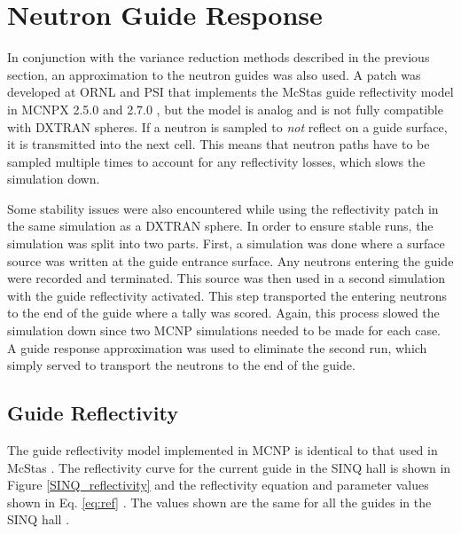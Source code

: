 \documentclass[a4paper]{jpconf}
\begin{document}
\section{Neutron Guide Response} 

In conjunction with the variance reduction methods described in the previous section, an approximation to the neutron guides was also used.  A patch was developed at ORNL and PSI that implements the McStas guide reflectivity model in MCNPX 2.5.0 and 2.7.0 \cite{mcnp_reflectivity, EK_reflectivity}, but the model is analog and is not fully compatible with DXTRAN spheres.  If a neutron is sampled to \emph{not} reflect on a guide surface, it is transmitted into the next cell.  This means that neutron paths have to be sampled multiple times to account for any reflectivity losses, which slows the simulation down.  

Some stability issues were also encountered while using the reflectivity patch in the same simulation as a DXTRAN sphere.  In order to ensure stable runs, the simulation was split into two parts.  First, a simulation was done where a surface source was written at the guide entrance surface.  Any neutrons entering the guide were recorded and terminated.  This source was then used in a second simulation with the guide reflectivity activated.  This step transported the entering neutrons to the end of the guide where a tally was scored.  Again, this process slowed the simulation down since two MCNP simulations needed to be made for each case.  A guide response approximation was used to eliminate the second run, which simply served to transport the neutrons to the end of the guide.


\subsection{Guide Reflectivity}

The guide reflectivity model implemented in MCNP is identical to that used in McStas \cite{mcnp_reflectivity}.  The reflectivity curve for the current guide in the SINQ hall is shown in Figure \ref{SINQ_reflectivity} and the reflectivity equation and parameter values shown in Eq. \ref{eq:ref} \cite{mcstas}.  The values shown are the same for all the guides in the SINQ hall \cite{SINQ_guide_values}.
\end{document}
